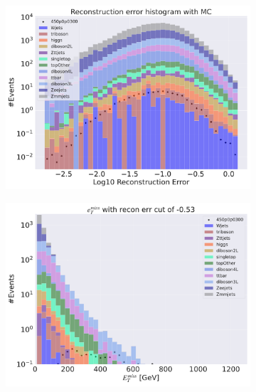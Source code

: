 \begin{figure}[H]
    \centering
    \begin{subfigure}{.49\textwidth}
        \includegraphics[width=\textwidth]{Figures/VAE_testing/small/3lep/b_data_recon_big_rm3_feats_sig_450p0p0300.pdf}
        \caption{ }
        \label{fig:VAE_3lep_small_450_3}
    \end{subfigure}
    \hfill
    \begin{subfigure}{.49\textwidth}
        \includegraphics[width=\textwidth]{Figures/VAE_testing/small/3lep/b_data_recon_big_rm3_feats_sig_450p0p0300_etmiss_recon_errcut_-0.53.pdf}
        \caption{}
        \label{fig:VAE_3lep_small_etmiss_450_3}
    \end{subfigure}

\end{figure}
